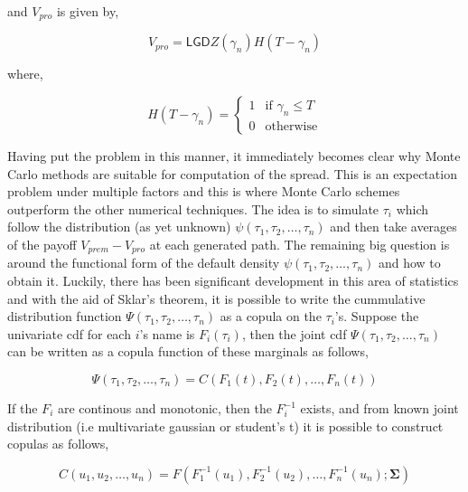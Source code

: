 \documentclass[a4paper,12pt]{article}
\begin{document}
and $V_{pro}$  is given by, 

\begin{equation}
V_{pro} = \mathsf{LGD}Z(\gamma_n)H(T - \gamma_n)
\end{equation}

where, 

$$ H(T - \gamma_n) = \begin{cases} 1 & \text{if } \gamma_n \leq T \\ 0 & \text{otherwise} \end{cases} $$

Having put the problem in this manner, it immediately becomes clear why Monte Carlo methods are suitable for computation of the spread. This is an expectation problem under multiple factors and this is where Monte Carlo schemes outperform the other numerical techniques. The idea is to simulate $\tau_i$ which follow the distribution (as yet unknown) $\psi(\tau_1, \tau_2, \dots, \tau_n)$ and then take averages of the payoff $V_{prem} - V_{pro}$ at each generated path.
\newline 
The remaining big question is around the functional form of the default density $\psi(\tau_1, \tau_2, \dots, \tau_n)$ and how to obtain it. Luckily, there has been significant development in this area of statistics and with the aid of Sklar's theorem, it is possible to write the cummulative distribution function $\Psi(\tau_1, \tau_2, \dots, \tau_n)$ as a copula on the $\tau_i$'s. Suppose the univariate cdf for each $i$'s name is $F_i(\tau_i)$, then the joint cdf $\Psi(\tau_1, \tau_2, \dots, \tau_n)$ can be written as a copula function of these marginals as follows, 

\begin{equation}
\Psi(\tau_1, \tau_2, \dots, \tau_n) = C(F_1(t), F_2(t), \dots, F_n(t))
\end{equation}

If the $F_i$ are continous and monotonic, then the $F_i^{-1}$ exists, and from known joint distribution (i.e multivariate gaussian or student's t) it is possible to construct copulas as follows, 

\begin{equation}
C(u_1, u_2, \dots, u_n) = F(F_1^{-1}(u_1), F_2^{-1}(u_2), \dots, F_n^{-1}(u_n); \mathbf{\Sigma})
\end{equation}
\end{document}
